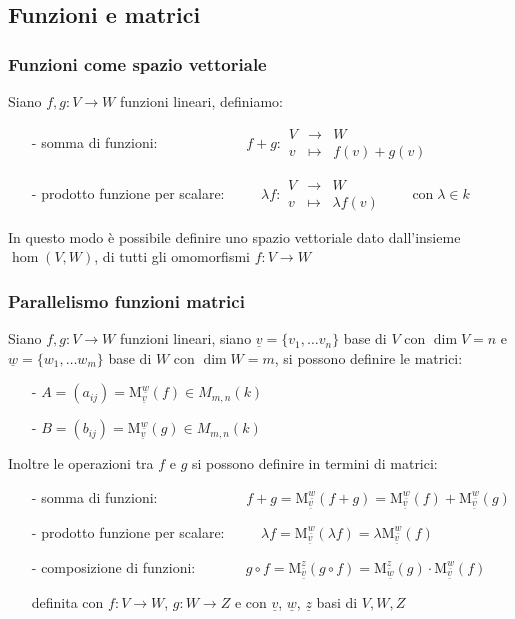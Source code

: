 \documentclass[a4paper]{article}
\newcommand\f[4]{\begin{smallmatrix} {#1} &\to &{#2} \\ {#3} &\mapsto &{#4} \end{smallmatrix}}
\newcommand\m[2]{\text{M}_{\underline{#1}}^{\underline{#2}}}
\begin{document}
\subsection{Funzioni e matrici}
\subsubsection*{Funzioni come spazio vettoriale}
Siano \(f, g: V \to W\) funzioni lineari, definiamo:
\begin{itemize}
	\item[-] somma di funzioni: \(\qquad \qquad \qquad f + g: \f{V}{W}{v}{f(v) + g(v)}\)
	\item[-] prodotto funzione per scalare: \(\qquad \; \lambda f: \f{V}{W}{v}{\lambda f(v)} \qquad \text{con} \; \lambda \in k\)
\end{itemize}
In questo modo è possibile definire uno spazio vettoriale dato dall'insieme \(\hom(V,W)\), di tutti gli omomorfismi \(f: V \to W\)

\subsubsection*{Parallelismo funzioni matrici}
Siano \(f, g: V \to W\) funzioni lineari, siano \(\underline{v} = \{ v_1, \dots v_n \}\) base di \(V\) con \(\dim V = n\) e
\(\underline{w} = \{ w_1, \dots w_m \}\) base di \(W\) con \(\dim W = m\), si possono definire le matrici:
\begin{itemize}
	\item[-] \(A = (a_{ij}) = \m{v}{w}(f) \in M_{m,n}(k)\)
	\item[-] \(B = (b_{ij}) = \m{v}{w}(g) \in M_{m,n}(k)\)
\end{itemize}
Inoltre le operazioni tra \(f\) e \(g\) si possono definire in termini di matrici:
\begin{itemize}
	\item[-] somma di funzioni: \(\qquad \qquad \qquad f + g = \m{v}{w}(f + g) = \m{v}{w}(f) + \m{v}{w}(g)\)
	\item[-] prodotto funzione per scalare: \(\qquad \;\lambda f = \m{v}{w}(\lambda f) = \lambda \m{v}{w}(f)\)
	\item[-] composizione di funzioni: \(\qquad \quad \; g \circ f = \m{v}{z}(g \circ f) = \m{w}{z}(g) \cdot \m{v}{w}(f)\)
	\item[] definita con \(f: V \to W\), \(g: W \to Z\) e con \(\underline{v}\), \(\underline{w}\), \(\underline{z}\) basi di \(V, W, Z\)
\end{itemize}
\end{document}
